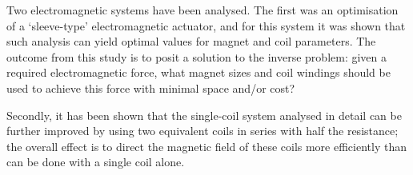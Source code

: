 \documentclass[11pt,a4paper]{memoir}
\begin{document}
Two electromagnetic systems have been analysed.
The first was an optimisation of a `sleeve-type' electromagnetic actuator, and for this system it was shown that such analysis can yield optimal values for magnet and coil parameters.
The outcome from this study is to posit a solution to the inverse problem: given a required electromagnetic force, what magnet sizes and coil windings should be used to achieve this force with minimal space and/or cost?

Secondly, it has been shown that the single-coil system analysed in detail can be further improved by using two equivalent coils in series with half the resistance; the overall effect is to direct the magnetic field of these coils more efficiently than can be done with a single coil alone.
\end{document}
